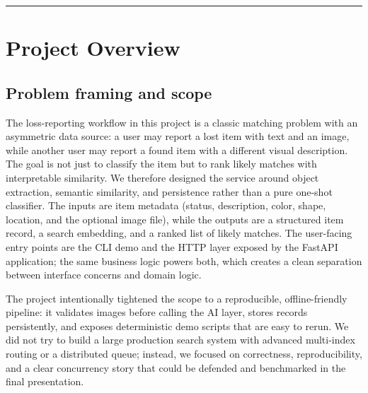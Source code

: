 \documentclass[11pt,a4paper]{article}
\begin{document}
\tableofcontents
\vspace{0.6em}\hrule\vspace{0.4em}

\section{Project Overview}
\subsection{Problem framing and scope}
The loss-reporting workflow in this project is a classic matching problem with an asymmetric data source: a user may report a lost item with text and an image, while another user may report a found item with a different visual description. The goal is not just to classify the item but to rank likely matches with interpretable similarity. We therefore designed the service around object extraction, semantic similarity, and persistence rather than a pure one-shot classifier. The inputs are item metadata (status, description, color, shape, location, and the optional image file), while the outputs are a structured item record, a search embedding, and a ranked list of likely matches. The user-facing entry points are the CLI demo and the HTTP layer exposed by the FastAPI application; the same business logic powers both, which creates a clean separation between interface concerns and domain logic.

The project intentionally tightened the scope to a reproducible, offline-friendly pipeline: it validates images before calling the AI layer, stores records persistently, and exposes deterministic demo scripts that are easy to rerun. We did not try to build a large production search system with advanced multi-index routing or a distributed queue; instead, we focused on correctness, reproducibility, and a clear concurrency story that could be defended and benchmarked in the final presentation.
\end{document}
